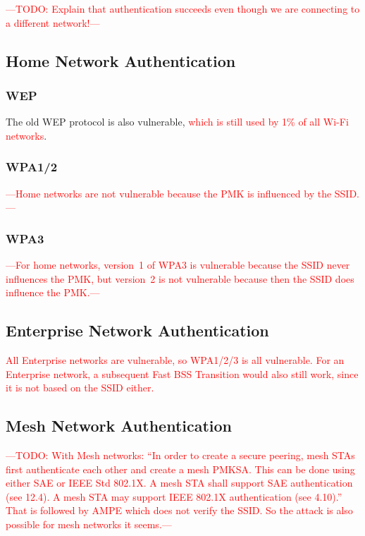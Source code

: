 \documentclass[sigconf,review,anonymous]{acmart}
\newcommand{\wifi}{\mbox{Wi-Fi}}
\DeclareRobustCommand{\red}[1]{\textcolor{red}{#1}}
\begin{document}
\red{---TODO: Explain that authentication succeeds even though we are connecting to a different network!---}



\subsection{Home Network Authentication}

\subsubsection{WEP}
The old WEP protocol is also vulnerable, \red{which is still used by 1\% of all \wifi{} networks}.

\subsubsection{WPA1/2}

\red{---Home networks are not vulnerable because the PMK is influenced by the SSID.---}

\subsubsection{WPA3}

\red{---For home networks, version~1 of WPA3 is vulnerable because the SSID never influences the PMK, but version~2 is not vulnerable because then the SSID does influence the PMK.---}

\subsection{Enterprise Network Authentication} %

\red{All Enterprise networks are vulnerable, so WPA1/2/3 is all vulnerable.
For an Enterprise network, a subsequent Fast BSS Transition would also still work, since it is not based on the SSID either.}

\subsection{Mesh Network Authentication}

\red{---TODO: With Mesh networks: ``In order to create a secure peering, mesh STAs first authenticate each other and create a mesh PMKSA. This can be done using either SAE or IEEE Std 802.1X. A mesh STA shall support SAE authentication (see 12.4). A mesh STA may support IEEE 802.1X authentication (see 4.10).''
That is followed by AMPE which does not verify the SSID.
So the attack is also possible for mesh networks it seems.---}
\end{document}
